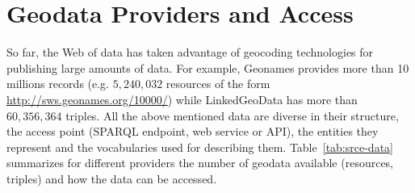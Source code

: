 \section{Geodata Providers and Access}
So far, the Web of data has taken advantage of geocoding technologies for publishing large amounts of data. For example, Geonames provides more than 10 millions records (e.g. $5,240,032$ resources of the form \url{http://sws.geonames.org/10000/}) while LinkedGeoData has more than $60,356,364$ triples. All the above mentioned data are diverse in their structure, the access point (SPARQL endpoint, web service or API), the entities they represent and the vocabularies used for describing them. Table~\ref{tab:srce-data} summarizes for different providers the number of geodata available (resources, triples) and how the data can be accessed.
\begin{table}[!htbp]
\end{table}



